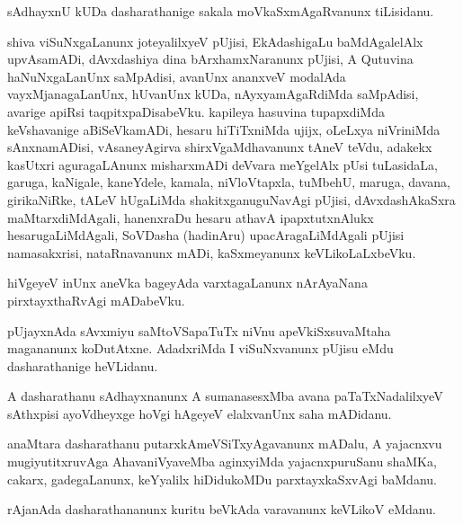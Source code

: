 \documentclass{article}
\begin{document}
\begin{mn}
sAdhayxnU  kUDa  dasharathanige  sakala  moVkaSxmAgaRvanunx  tiLisidanu.  
\end{mn}

\begin{mn}
shiva viSuNxgaLanunx  joteyalilxyeV  pUjisi,  EkAdashigaLu  baMdAgalelAlx  upvAsamADi,  dAvxdashiya  
dina  bArxhamxNaranunx  pUjisi,  A  Qutuvina  haNuNxgaLanUnx  saMpAdisi,  avanUnx  ananxveV  modalAda  
vayxMjanagaLanUnx,  hUvanUnx  kUDa,  nAyxyamAgaRdiMda  saMpAdisi,  avarige  apiRsi  taqpitxpaDisabeVku.  
kapileya  hasuvina  tupapxdiMda  keVshavanige  aBiSeVkamADi,  hesaru  hiTiTxniMda  ujijx,  oLeLxya  
niVriniMda  sAnxnamADisi,  vAsaneyAgirva  shirxVgaMdhavanunx  tAneV  teVdu,  adakekx  kasUtxri  
aguragaLAnunx  misharxmADi  deVvara  meYgelAlx  pUsi  tuLasidaLa,  garuga,  kaNigale,  kaneYdele,  
kamala,  niVloVtapxla,  tuMbehU,  maruga,  davana,  girikaNiRke,  tALeV  hUgaLiMda  shakitxganuguNavAgi  
pUjisi,  dAvxdashAkaSxra  maMtarxdiMdAgali,  hanenxraDu  hesaru  athavA  ipapxtutxnAlukx  hesarugaLiMdAgali,  
SoVDasha (hadinAru) upacAragaLiMdAgali  pUjisi  namasakxrisi,  nataRnavanunx  mADi,  kaSxmeyanunx  keVLikoLaLxbeVku.
\end{mn}

\begin{mn}
hiVgeyeV  inUnx  aneVka  bageyAda  varxtagaLanunx  nArAyaNana  pirxtayxthaRvAgi  mADabeVku.
\end{mn}

\begin{mn}
pUjayxnAda  sAvxmiyu  saMtoVSapaTuTx  niVnu  apeVkiSxsuvaMtaha  magananunx  koDutAtxne.  AdadxriMda  I  
viSuNxvanunx  pUjisu  eMdu  dasharathanige  heVLidanu.
\end{mn}

\begin{mn}
A  dasharathanu  sAdhayxnanunx  A  sumanasesxMba  avana  paTaTxNadalilxyeV  sAthxpisi  ayoVdheyxge  hoVgi  
hAgeyeV  elalxvanUnx  saha  mADidanu.
\end{mn}

\begin{mn}
anaMtara  dasharathanu  putarxkAmeVSiTxyAgavanunx  mADalu,  A  yajacnxvu  mugiyutitxruvAga  AhavaniVyaveMba  
aginxyiMda  yajacnxpuruSanu  shaMKa,  cakarx,  gadegaLanunx,  keYyalilx  hiDidukoMDu  parxtayxkaSxvAgi  baMdanu.
\end{mn}

\begin{mn}
rAjanAda  dasharathananunx  kuritu  beVkAda  varavanunx  keVLikoV  eMdanu.
\end{mn}
\end{document}
